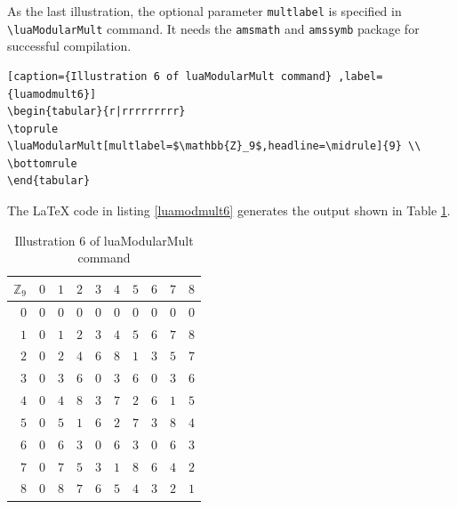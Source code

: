 ﻿\documentclass{article}
\begin{document}
As the last illustration, the optional parameter \verb|multlabel| is specified  in  \verb|\luaModularMult| command.  It needs the \verb|amsmath| and \verb|amssymb| package for successful compilation.
\begin{lstlisting}[caption={Illustration 6 of luaModularMult command} ,label={luamodmult6}]
\begin{tabular}{r|rrrrrrrrr}
\toprule
\luaModularMult[multlabel=$\mathbb{Z}_9$,headline=\midrule]{9} \\
\bottomrule
\end{tabular}
\end{lstlisting}
The LaTeX code in listing \ref{luamodmult6} generates the output shown in Table  \ref{luamodmult6tbl}.
\begin{table}[H]
\centering
\begin{tabular}{r|rrrrrrrrr}
\toprule
$\mathbb{Z}_9$  & $0$ & $1$ & $2$ & $3$ & $4$ & $5$ & $6$ & $7$ & $8$\\ \midrule $0$ & $0$ & $0$ & $0$ & $0$ & $0$ & $0$ & $0$ & $0$ & $0$\\ $1$ & $0$ & $1$ & $2$ & $3$ & $4$ & $5$ & $6$ & $7$ & $8$\\ $2$ & $0$ & $2$ & $4$ & $6$ & $8$ & $1$ & $3$ & $5$ & $7$\\ $3$ & $0$ & $3$ & $6$ & $0$ & $3$ & $6$ & $0$ & $3$ & $6$\\ $4$ & $0$ & $4$ & $8$ & $3$ & $7$ & $2$ & $6$ & $1$ & $5$\\ $5$ & $0$ & $5$ & $1$ & $6$ & $2$ & $7$ & $3$ & $8$ & $4$\\ $6$ & $0$ & $6$ & $3$ & $0$ & $6$ & $3$ & $0$ & $6$ & $3$\\ $7$ & $0$ & $7$ & $5$ & $3$ & $1$ & $8$ & $6$ & $4$ & $2$\\ $8$ & $0$ & $8$ & $7$ & $6$ & $5$ & $4$ & $3$ & $2$ & $1$\\
\bottomrule
\end{tabular}
\caption{Illustration 6 of luaModularMult command}
\label{luamodmult6tbl}
\end{table}
\end{document}
